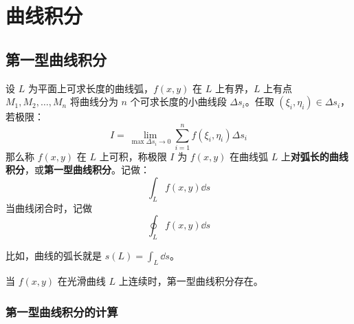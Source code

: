\section{曲线积分}

\subsection{第一型曲线积分}

\begin{definition}[第一型曲线积分]
	设 $L$ 为平面上可求长度的曲线弧，$f(x, y)$ 在 $L$ 上有界，$L$ 上有点 $M_1, M_2, \dots, M_n$ 将曲线分为 $n$ 个可求长度的小曲线段 $\Delta s_i$。任取 $(\xi_i, \eta_i) \in \Delta s_i$，若极限：
	$$
	I = \lim_{\max \Delta s_i \to 0} \sum_{i = 1}^{n} f(\xi_i, \eta_i) \Delta s_i
	$$
	那么称 $f(x, y)$ 在 $L$ 上可积，称极限 $I$ 为 $f(x, y)$ 在曲线弧 $L$ 上\textbf{对弧长的曲线积分}，或\textbf{第一型曲线积分}。记做：
	$$
	\int_L f(x, y) \dd{s}
	$$
	当曲线闭合时，记做
	$$
	\oint_L f(x, y) \dd{s}
	$$
\end{definition}

比如，曲线的弧长就是 $\displaystyle s(L) = \int_L \dd{s}$。

\begin{theorem}
	当 $f(x, y)$ 在光滑曲线 $L$ 上连续时，第一型曲线积分存在。
\end{theorem}

\subsubsection{第一型曲线积分的计算}

